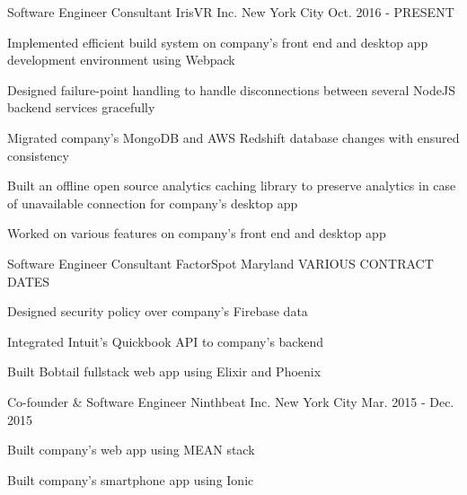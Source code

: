 

\begin{cventries}

  \cventry
    {Software Engineer Consultant} %
    {IrisVR Inc.} %
    {New York City} %
    {Oct. 2016 - PRESENT} %
    {
      \begin{cvitems} %
        \item {Implemented efficient build system on company's front end and desktop app development environment using Webpack}
        \item {Designed failure-point handling to handle disconnections between several NodeJS backend services gracefully}
        \item {Migrated company's MongoDB and AWS Redshift database changes with ensured consistency}
        \item {Built an offline open source analytics caching library to preserve analytics in case of unavailable connection for company's desktop app}
        \item {Worked on various features on company's front end and desktop app}
      \end{cvitems}
    }

  \cventry
    {Software Engineer Consultant} %
    {FactorSpot} %
    {Maryland} %
    {VARIOUS CONTRACT DATES} %
    {
      \begin{cvitems} %
        \item {Designed security policy over company's Firebase data}
        \item {Integrated Intuit's Quickbook API to company's backend}
        \item {Built Bobtail fullstack web app using Elixir and Phoenix}
      \end{cvitems}
    }

  \cventry
    {Co-founder \& Software Engineer} %
    {Ninthbeat Inc.} %
    {New York City} %
    {Mar. 2015 - Dec. 2015} %
    {
      \begin{cvitems} %
        \item {Built company's web app using MEAN stack}
        \item {Built company's smartphone app using Ionic}
      \end{cvitems}
    }


\end{cventries}
